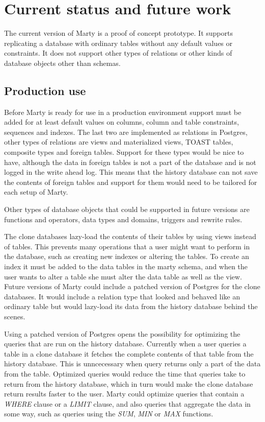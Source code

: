 \chapter{Current status and future work}
\label{ch:current-status}
The current version of Marty is a proof of concept prototype.
It supports replicating a database with ordinary tables without any default values or constraints.
It does not support other types of relations or other kinds of database objects other than schemas.

\section{Production use}
Before Marty is ready for use in a production environment support must be added for at least default values on columns, column and table constraints, sequences and indexes.
The last two are implemented as relations in Postgres, other types of relations are views and materialized views, TOAST tables, composite types and foreign tables.
Support for these types would be nice to have, although the data in foreign tables is not a part of the database and is not logged in the write ahead log.
This means that the history database can not save the contents of foreign tables and support for them would need to be tailored for each setup of Marty.

Other types of database objects that could be supported in future versions are functions and operators, data types and domains, triggers and rewrite rules.

The clone databases lazy-load the contents of their tables by using views instead of tables.
This prevents many operations that a user might want to perform in the database, such as creating new indexes or altering the tables.
To create an index it must be added to the data tables in the marty schema, and when the user wants to alter a table she must alter the data table as well as the view.
Future versions of Marty could include a patched version of Postgres for the clone databases.
It would include a relation type that looked and behaved like an ordinary table but would lazy-load its data from the history database behind the scenes.

Using a patched version of Postgres opens the possibility for optimizing the queries that are run on the history database.
Currently when a user queries a table in a clone database it fetches the complete contents of that table from the history database.
This is unncecessary when query returns only a part of the data from the table.
Optimized queries would reduce the time that queries take to return from the history database, which in turn would make the clone database return results faster to the user.
Marty could optimize queries that contain a \textit{WHERE} clause or a \textit{LIMIT} clause, and also queries that aggregate the data in some way, such as queries using the \textit{SUM}, \textit{MIN} or \textit{MAX} functions.

